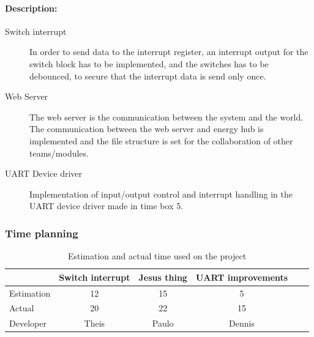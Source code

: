 \paragraph{Description:}
\begin{description}
	\item[Switch interrupt] In order to send data to the interrupt register, an interrupt output for the switch block has to be implemented, and the switches has to be debounced, to secure that the interrupt data is send only once.
	\item[Web Server] The web server is the communication between the system and the world. The communication between the web server and energy hub is implemented and the file structure is set for the collaboration of other teams/modules.
	\item[UART Device driver] Implementation of input/output control and interrupt handling in the UART device driver made in time box 5.
\end{description}

\subsubsection{Time planning}

\begin{table}[H]
\centering
	\begin{tabular}{|l|c|c|c|c|c|}
		\hline
		~			& Switch interrupt		& Jesus thing		& UART improvements	\\ \hline
		Estimation	& 12					& 15				& 5					\\
		Actual		& 20					& 22				& 15				\\
		Developer	& Theis					& Paulo			& Dennis				\\
		\hline
	\end{tabular}
	\caption{Estimation and actual time used on the project}
\end{table}


